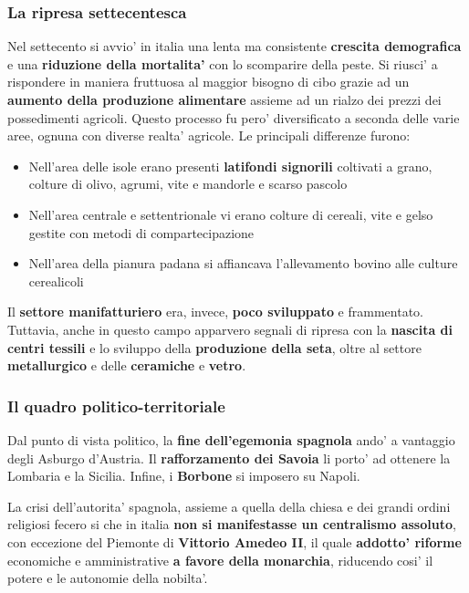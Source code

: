 \documentclass{article}
\begin{document}
{{    \subsubsection{La ripresa settecentesca}
    Nel settecento si avvio' in italia una lenta ma consistente \textbf{crescita demografica} e una \textbf{riduzione della mortalita'} con lo scomparire della peste. Si riusci' a rispondere in maniera fruttuosa al maggior bisogno di cibo grazie ad un \textbf{aumento della produzione alimentare} assieme ad un rialzo dei prezzi dei possedimenti agricoli. Questo processo fu pero' diversificato a seconda delle varie aree, ognuna con diverse realta' agricole. Le principali differenze furono:

    \begin{itemize}
      \item Nell'area delle isole erano presenti \textbf{latifondi signorili} coltivati a grano, colture di olivo, agrumi, vite e mandorle e scarso pascolo
      \item Nell'area centrale e settentrionale vi erano colture di cereali, vite e gelso gestite con metodi di compartecipazione
      \item  Nell'area della pianura padana si affiancava l'allevamento bovino alle culture cerealicoli
    \end{itemize}

    Il \textbf{settore manifatturiero} era, invece, \textbf{poco sviluppato} e frammentato. Tuttavia, anche in questo campo apparvero segnali di ripresa con la \textbf{nascita di centri tessili} e lo sviluppo della \textbf{produzione della seta}, oltre al settore \textbf{metallurgico} e delle \textbf{ceramiche} e \textbf{vetro}.

    \subsubsection{Il quadro politico-territoriale}
    Dal punto di vista politico, la \textbf{fine dell'egemonia spagnola} ando' a vantaggio degli Asburgo d'Austria. Il \textbf{rafforzamento dei Savoia} li porto' ad ottenere la Lombaria e la Sicilia. Infine, i \textbf{Borbone} si imposero su Napoli.

    La crisi dell'autorita' spagnola, assieme a quella della chiesa e dei grandi ordini religiosi fecero si che in italia \textbf{non si manifestasse un centralismo assoluto}, con eccezione del Piemonte di \textbf{Vittorio Amedeo II}, il quale \textbf{addotto' riforme} economiche e amministrative \textbf{a favore della monarchia}, riducendo cosi' il potere e le autonomie della nobilta'.

}}
\end{document}
